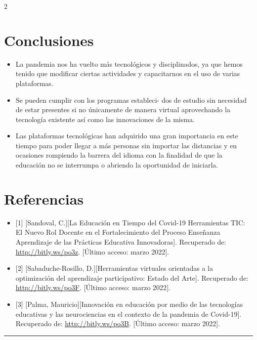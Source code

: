 \documentclass[12pt,spanish,Letterpaper,openany]{book}
\providecommand{\tightlist}{%
  \setlength{\itemsep}{0pt}\setlength{\parskip}{0pt}}
\newcommand{\HRule}{\begin{center}\rule{0.5\linewidth}{0.2mm}\end{center}}
\begin{document}
\begin {multicols}{2}
\begin {flushleft}
\begin{minipage}[c]{\columnwidth}
\end{minipage}
\end {flushleft}

\hypertarget{conclusiones-2}{%
\section{Conclusiones}\label{conclusiones-2}}

\begin{itemize}
\tightlist
\item
  La pandemia nos ha vuelto más tecnológicos y disciplinados, ya que hemos tenido que modificar ciertas actividades y capacitarnos en el uso de varias plataformas.
\item
  Se pueden cumplir con los programas estableci-
  dos de estudio sin necesidad de estar presentes si no únicamente de manera virtual aprovechando la tecnología existente así como las innovaciones de la misma.
\item
  Las plataformas tecnológicas han adquirido una gran importancia en este tiempo para poder llegar a más personas sin importar las distancias y en ocasiones rompiendo la barrera del idioma con la finalidad de que la educación no se interrumpa o abriendo la oportunidad de iniciarla.
\end{itemize}

\hypertarget{referencias-5}{%
\section*{Referencias}\label{referencias-5}}

\begin{itemize}
\item
  {[}1{]} {[}Sandoval, C.{]}{[}La Educación en Tiempo del Covid-19 Herramientas TIC: El Nuevo Rol Docente en el Fortalecimiento del Proceso Enseñanza Aprendizaje de las Prácticas Educativa Innovadoras{]}. Recuperado de: \url{http://bitly.ws/po3z}. {[}Último acceso: marzo 2022{]}.
\item
  {[}2{]} {[}Sabaduche-Rosillo, D.{]}{[}Herramientas virtuales orientadas a la optimización del aprendizaje participativo: Estado del Arte{]}. Recuperado de: \url{http://bitly.ws/po3F}. {[}Último acceso: marzo 2022{]}.
\item
  {[}3{]} {[}Palma, Mauricio{]}{[}Innovación en educación por medio de las tecnologías educativas y las neurociencias en el contexto de la pandemia de Covid-19{]}. Recuperado de: \url{http://bitly.ws/po3B}. {[}Último acceso: marzo 2022{]}.
\end{itemize}

\end {multicols}
\medskip
\HRule
\medskip
\end{document}
